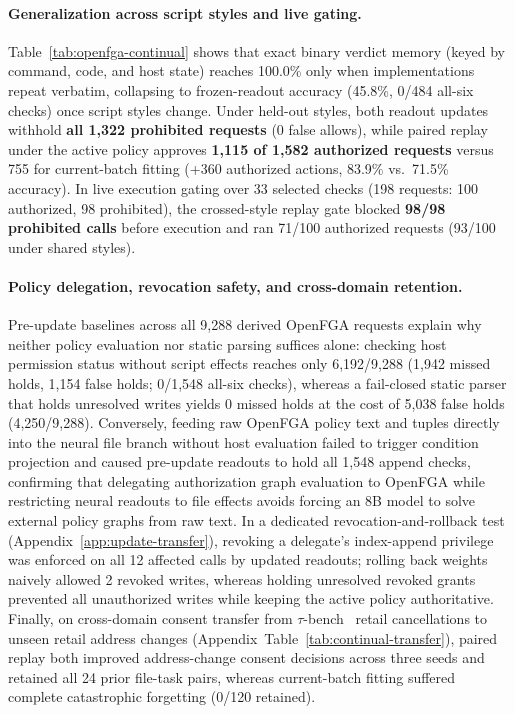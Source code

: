 \documentclass[sigconf,anonymous,nonacm]{acmart}
\begin{document}
\paragraph{Generalization across script styles and live gating.}
Table~\ref{tab:openfga-continual} shows that exact binary verdict memory (keyed by command, code, and host state) reaches 100.0\% only when implementations repeat verbatim, collapsing to frozen-readout accuracy (45.8\%, 0/484 all-six checks) once script styles change. Under held-out styles, both readout updates withhold \textbf{all 1,322 prohibited requests} (0 false allows), while paired replay under the active policy approves \textbf{1,115 of 1,582 authorized requests} versus 755 for current-batch fitting (+360 authorized actions, 83.9\% vs.\ 71.5\% accuracy). In live execution gating over 33 selected checks (198 requests: 100 authorized, 98 prohibited), the crossed-style replay gate blocked \textbf{98/98 prohibited calls} before execution and ran 71/100 authorized requests (93/100 under shared styles).

\paragraph{Policy delegation, revocation safety, and cross-domain retention.}
Pre-update baselines across all 9,288 derived OpenFGA requests explain why neither policy evaluation nor static parsing suffices alone: checking host permission status without script effects reaches only 6,192/9,288 (1,942 missed holds, 1,154 false holds; 0/1,548 all-six checks), whereas a fail-closed static parser that holds unresolved writes yields 0 missed holds at the cost of 5,038 false holds (4,250/9,288). Conversely, feeding raw OpenFGA policy text and tuples directly into the neural file branch without host evaluation failed to trigger condition projection and caused pre-update readouts to hold all 1,548 append checks, confirming that delegating authorization graph evaluation to OpenFGA while restricting neural readouts to file effects avoids forcing an 8B model to solve external policy graphs from raw text. In a dedicated revocation-and-rollback test (Appendix~\ref{app:update-transfer}), revoking a delegate's index-append privilege was enforced on all 12 affected calls by updated readouts; rolling back weights naively allowed 2 revoked writes, whereas holding unresolved revoked grants prevented all unauthorized writes while keeping the active policy authoritative. Finally, on cross-domain consent transfer from $\tau$-bench~\cite{taubench} retail cancellations to unseen retail address changes (Appendix~Table~\ref{tab:continual-transfer}), paired replay both improved address-change consent decisions across three seeds and retained all 24 prior file-task pairs, whereas current-batch fitting suffered complete catastrophic forgetting (0/120 retained).
\end{document}
